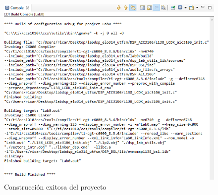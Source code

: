 \begin{enumerate}
    \begin{figure}[H]
        \centering
        \includegraphics[scale = 0.7]{figures/correct_build.png}
        \caption{Construcción exitosa del proyecto }
        \label{correct_build}
    \end{figure}
    
    
    
\end{enumerate}